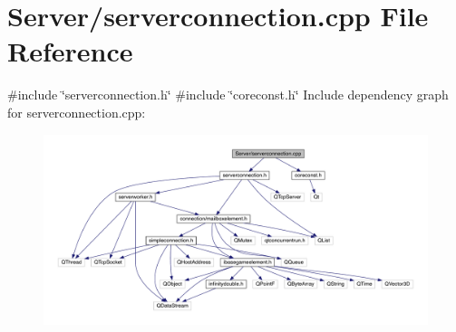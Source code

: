 \hypertarget{a00101}{}\section{Server/serverconnection.cpp File Reference}
\label{a00101}
{\ttfamily \#include \char`\"{}serverconnection.\+h\char`\"{}}\newline
{\ttfamily \#include \char`\"{}coreconst.\+h\char`\"{}}\newline
Include dependency graph for serverconnection.\+cpp\+:
\nopagebreak
\begin{figure}[H]
\begin{center}
\leavevmode
\includegraphics[width=350pt]{d9/dcc/a00102}
\end{center}
\end{figure}
